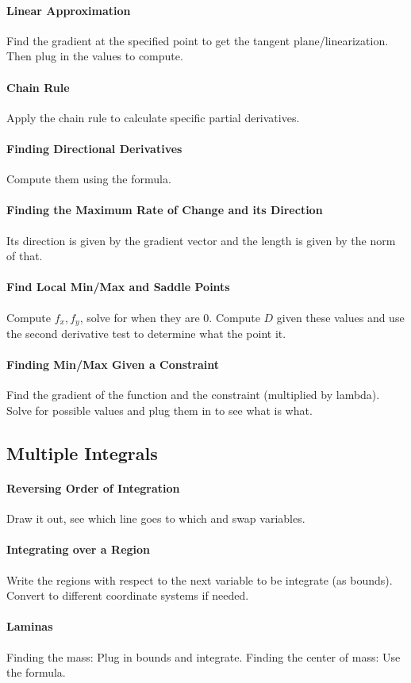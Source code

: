 \documentclass[12 pt]{article}
\theoremstyle{definition}
\begin{document}
\paragraph{Linear Approximation} Find the gradient at the specified point to get the tangent plane/linearization. Then plug in the values to compute.
\paragraph{Chain Rule} Apply the chain rule to calculate specific partial derivatives.
\paragraph{Finding Directional Derivatives} Compute them using the formula.
\paragraph{Finding the Maximum Rate of Change and its Direction}Its direction is given by the gradient vector and the length is given by the norm of that.
\paragraph{Find Local Min/Max and Saddle Points}Compute $f_x, f_y$, solve for when they are $0$. Compute $D$ given these values and use the second derivative test to determine what the point it.
\paragraph{Finding Min/Max Given a Constraint} Find the gradient of the function and the constraint (multiplied by lambda). Solve for possible values and plug them in to see what is what.
\subsection{Multiple Integrals}
\paragraph{Reversing Order of Integration} Draw it out, see which line goes to which and swap variables.
\paragraph{Integrating over a Region} Write the regions with respect to the next variable to be integrate (as bounds). Convert to different coordinate systems if needed.
\paragraph{Laminas} Finding the mass: Plug in bounds and integrate. Finding the center of mass: Use the formula. 
\end{document}
